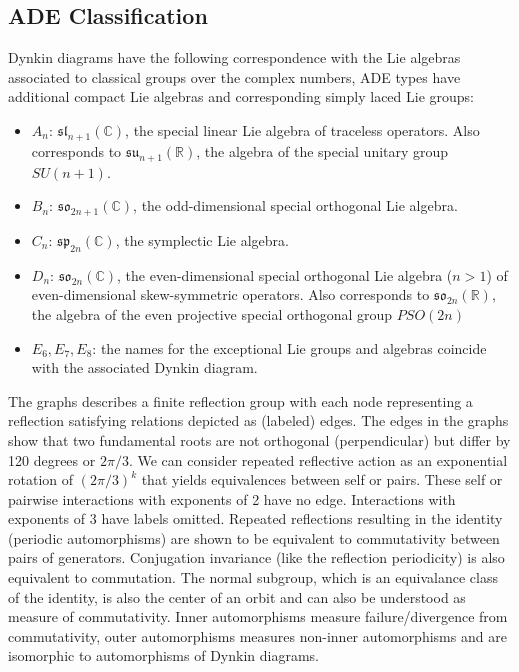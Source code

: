 \documentclass{article}
\theoremstyle{definition}
\begin{document}
\subsection{ADE Classification}
\label{sec:ade}
Dynkin diagrams have the following correspondence with the Lie algebras associated to classical groups over the complex numbers, ADE types have additional compact Lie algebras and corresponding simply laced Lie groups:
\begin{itemize}
    \item $A_{n}$: ${\mathfrak{sl}}_{{n+1}}(\mathbb{C})$, the special linear Lie algebra of traceless operators. Also corresponds to $\mathfrak{su}_{n+1}(\mathbb{R})$, the algebra of the special unitary group $SU(n+1)$.
    \item $B_{n}$: ${\mathfrak  {so}}_{{2n+1}}(\mathbb{C})$, the odd-dimensional special orthogonal Lie algebra.
    \item  $C_{n}$: ${\mathfrak  {sp}}_{{2n}}(\mathbb{C})$, the symplectic Lie algebra.
    \item $D_{n}$: ${\mathfrak  {so}}_{{2n}}(\mathbb{C})$, the even-dimensional special orthogonal Lie algebra ($n>1$) of even-dimensional skew-symmetric operators. Also corresponds to $\mathfrak{so}_{2n}(\mathbb{R})$, the algebra of the even projective special orthogonal group $PSO(2n)$
    \item $E_6, E_7, E_8$: the names for  the exceptional Lie groups and algebras coincide with the associated Dynkin diagram.
\end{itemize}




The graphs describes a finite reflection group with each node representing a reflection satisfying relations depicted as (labeled) edges.
The edges in the graphs show that two fundamental roots are not orthogonal (perpendicular) but differ by 120 degrees or $2\pi/3$.
We can consider repeated reflective action as an exponential rotation of $(2 \pi /3)^k$ that yields equivalences between self or pairs. These self or pairwise interactions with exponents of 2 have no edge. Interactions with exponents of 3 have labels omitted. 
Repeated reflections resulting in the identity (periodic automorphisms) are shown to be equivalent to commutativity between pairs of generators.
Conjugation invariance (like the reflection periodicity) is also equivalent to commutation.
The normal subgroup, which is an equivalance class of the identity, is also the center of an orbit and can also be understood as measure of commutativity.
Inner automorphisms measure failure/divergence from commutativity, outer automorphisms measures non-inner automorphisms and are isomorphic to automorphisms of Dynkin diagrams.
\end{document}

